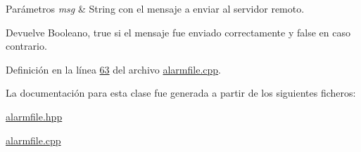 \begin{DoxyParams}{Parámetros}
{\em msg} & String con el mensaje a enviar al servidor remoto. \\
\hline
\end{DoxyParams}
\begin{DoxyReturn}{Devuelve}
Booleano, true si el mensaje fue enviado correctamente y false en caso contrario. 
\end{DoxyReturn}


Definición en la línea \hyperlink{alarmfile_8cpp_source_l00063}{63} del archivo \hyperlink{alarmfile_8cpp_source}{alarmfile.\+cpp}.



La documentación para esta clase fue generada a partir de los siguientes ficheros\+:\begin{DoxyCompactItemize}
\item 
\hyperlink{alarmfile_8hpp}{alarmfile.\+hpp}\item 
\hyperlink{alarmfile_8cpp}{alarmfile.\+cpp}\end{DoxyCompactItemize}
